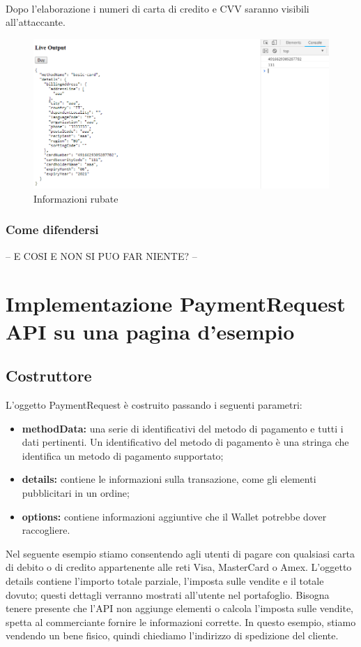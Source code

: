 \documentclass[11pt ,a4paper , twoside , openright ]{article}
\begin{document}
	\pagebreak
	\\
	Dopo l'elaborazione i numeri di carta di credito e CVV saranno visibili all'attaccante.
	\begin{figure}[h]
		\centering
		\includegraphics[width=1\linewidth]{Informazioni}
		\caption{Informazioni rubate}
		\label{fig: Informazioni rubate}
	\end{figure}
	\pagebreak
	\subsubsection{Come difendersi}
	-- E COSI E NON SI PUO FAR NIENTE? --
	\newpage
	\section{Implementazione PaymentRequest API su una pagina d'esempio}
	\subsection{Costruttore}
	L'oggetto PaymentRequest è costruito passando i seguenti parametri:
	\begin{itemize}
	\item \textbf{methodData:} una serie di identificativi del metodo di pagamento e tutti i dati pertinenti. Un identificativo del metodo di pagamento è una stringa che identifica un metodo di pagamento supportato;
	\item \textbf{details:} contiene le informazioni sulla transazione, come gli elementi pubblicitari in un ordine;
	\item \textbf{options:} contiene informazioni aggiuntive che il Wallet potrebbe dover raccogliere.
	\end{itemize}

	Nel seguente esempio stiamo consentendo agli utenti di pagare con qualsiasi carta di debito o di credito appartenente alle reti Visa, MasterCard o Amex. L'oggetto details contiene l'importo totale parziale, l'imposta sulle vendite e il totale dovuto; questi dettagli verranno mostrati all'utente nel portafoglio. Bisogna tenere presente che l'API non aggiunge elementi o calcola l'imposta sulle vendite, spetta al commerciante fornire le informazioni corrette. In questo esempio, stiamo vendendo un bene fisico, quindi chiediamo l'indirizzo di spedizione del cliente.
	
	
\end{document}
